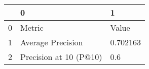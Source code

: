 \begin{tabular}{lll}
\toprule
{} &                       0 &         1 \\
\midrule
0 &                  Metric &     Value \\
1 &       Average Precision &  0.702163 \\
2 &  Precision at 10 (P@10) &       0.6 \\
\bottomrule
\end{tabular}

